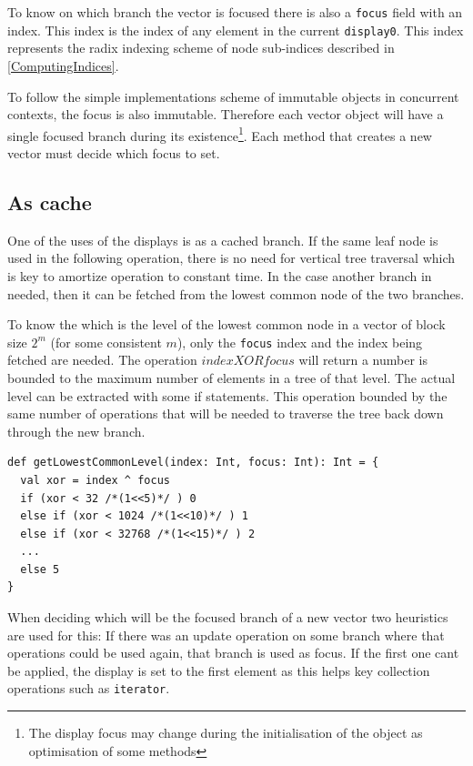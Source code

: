 To know on which branch the vector is focused there is also a \texttt{focus} field with an index. This index is the index of any element in the current \texttt{display0}. This index represents the radix indexing scheme of node sub-indices described in \ref{ComputingIndices}. 

To follow the simple implementations scheme of immutable objects in concurrent contexts, the focus is also immutable. Therefore each vector object will have a single focused branch during its existence\footnote{The display focus may change during the initialisation of the object as optimisation of some methods}. Each method that creates a new vector must decide which focus to set. 


\subsection{As cache}
One of the uses of the displays is as a cached branch. If the same leaf node is used in the following operation, there is no need for vertical tree traversal which is key to amortize operation to constant time. In the case another branch in needed, then it can be fetched from the lowest common node of the two branches. 

To know the which is the level of the lowest common node in a vector of block size $2^m$ (for some consistent $m$), only the \texttt{focus} index and the index being fetched are needed. The operation $index XOR focus$ will return a number is bounded to the maximum number of elements in a tree of that level. The actual level can be extracted with some if statements. This operation bounded by the same number of operations that will be needed to traverse the tree back down through the new branch.

\begin{lstlisting}[frame=single]
def getLowestCommonLevel(index: Int, focus: Int): Int = {
  val xor = index ^ focus
  if (xor < 32 /*(1<<5)*/ ) 0
  else if (xor < 1024 /*(1<<10)*/ ) 1
  else if (xor < 32768 /*(1<<15)*/ ) 2
  ...
  else 5
}
\end{lstlisting}

When deciding which will be the focused branch of a new vector two heuristics are used for this: If there was an update operation on some branch where that operations could be used again, that branch is used as focus. If the first one cant be applied, the display is set to the first element as this helps key collection operations such as \texttt{iterator}.

